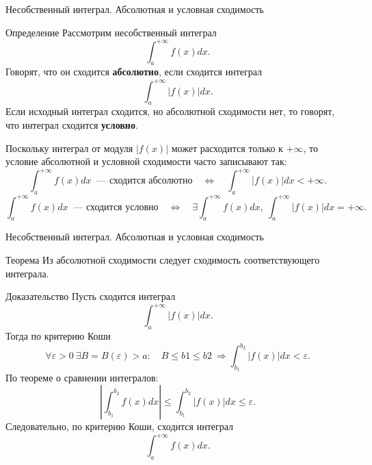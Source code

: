 \documentclass[8pt]{beamer}
\begin{document}

\begin{frame}{Несобственный интеграл. Абсолютная и условная сходимость}
\begin{block}{Определение}
Рассмотрим несобственный интеграл
$$\int_a^{+\infty}f(x)dx.$$
Говорят, что он сходится {\bf абсолютно}, если сходится интеграл
$$\int_a^{+\infty}|f(x)|dx.$$
Если исходный интеграл сходится, но абсолютной сходимости нет, то говорят, что интеграл сходится {\bf условно}.
\end{block}
Поскольку интеграл от модуля $|f(x)|$ может расходится только к $+\infty$, то условие абсолютной и условной сходимости часто записывают так:
$$\int_a^{+\infty}f(x)dx\ \text{ --- сходится абсолютно}\quad \Leftrightarrow \quad \int_a^{+\infty}|f(x)|dx<+\infty.$$
$$\int_a^{+\infty}f(x)dx\ \text{ --- сходится условно}\quad \Leftrightarrow \quad \exists\int_a^{+\infty}f(x)dx,\ \int_a^{+\infty}|f(x)|dx=+\infty.$$
\end{frame}

\begin{frame}{Несобственный интеграл.  Абсолютная и условная сходимость}

\begin{block}{Теорема}
Из абсолютной сходимости следует сходимость соответствующего интеграла.
\end{block}
\begin{block}{Доказательство}
Пусть сходится интеграл
$$\int_a^{+\infty}|f(x)|dx.$$
Тогда по критерию Коши
$$\forall \varepsilon>0\ \exists B=B(\varepsilon)>a:\quad B\le b1\le  b2\ \Rightarrow  \int_{b_1}^{b_2} |f(x)|dx <\varepsilon.$$
По теореме о сравнении интегралов:
$$\left| \int_{b_1}^{b_2} f(x)dx \right|\le \int_{b_1}^{b_2} |f(x)|dx\le \varepsilon.$$
Следовательно, по критерию Коши, сходится интеграл 
$$\int_a^{+\infty}f(x)dx.$$
\end{block}
\end{frame}
\end{document}
